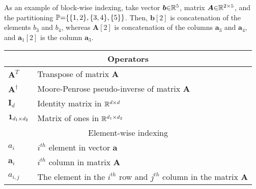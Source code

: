 As an example of block-wise indexing, take vector $\boldsymbol{b} {\in} \mathbb{R}^{5}$, matrix $\boldsymbol{A} {\in} \mathbb{R}^{2 {\times} 5}$, and the partitioning $\mathbb{P} {=} \{\{1,2\},\{3,4\},\{5\}\}$.
Then, $\boldsymbol{b}[2]$ is concatenation of the elements $b_3$ and $b_4$, whereas $\boldsymbol{A}[2]$ is concatenation of the columns $\boldsymbol{a}_3$ and $\boldsymbol{a}_4$, and $\boldsymbol{a}_1[2]$ is the column $\boldsymbol{a}_3$.
\begin{table}[hb]
\begin{center}
\begin{tabular}{cc}
\toprule
\multicolumn{2}{c}{Operators} \\ 
\midrule
\multicolumn{1}{l}{$\boldsymbol{A}^T$} & \multicolumn{1}{l}{Transpose of matrix $\boldsymbol{A}$}   \\
\multicolumn{1}{l}{$\boldsymbol{A}^\dagger$} & \multicolumn{1}{l}{Moore-Penrose pseudo-inverse of matrix $\boldsymbol{A}$}   \\
\multicolumn{1}{l}{$\boldsymbol{I}_{d}$} & \multicolumn{1}{l}{Identity matrix in $\mathbb{R}^{d {\times} d}$}   \\
\multicolumn{1}{l}{$\boldsymbol{1}_{d_1 {\times} d_2}$} & \multicolumn{1}{l}{Matrix of ones in $\mathbb{R}^{d_1 {\times} d_2}$}   \\
\midrule
\multicolumn{2}{c}{Element-wise indexing} \\ 
\midrule
\multicolumn{1}{l}{$a_i$} & \multicolumn{1}{l}{$i^{th}$ element in vector $\boldsymbol{a}$} \\
\multicolumn{1}{l}{$\boldsymbol{a}_i$} & \multicolumn{1}{l}{$i^{th}$ column in matrix $\boldsymbol{A}$} \\
\multicolumn{1}{l}{$a_{i,j}$} & \multicolumn{1}{l}{The element in the $i^{th}$ row and $j^{th}$ column in the matrix $\boldsymbol{A}$} \\

\end{tabular}
\end{center}
\end{table}
